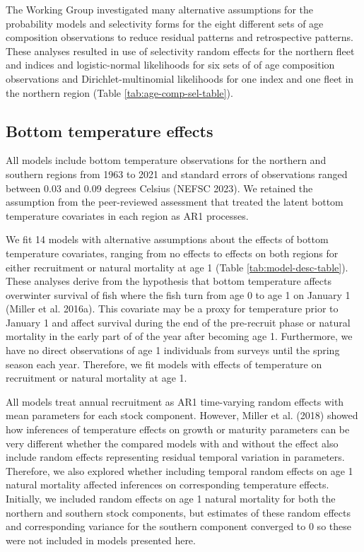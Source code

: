 \documentclass[
]{article}
\begin{document}
The Working Group investigated many alternative assumptions for the
probability models and selectivity forms for the eight different sets of
age composition observations to reduce residual patterns and
retrospective patterns. These analyses resulted in use of selectivity
random effects for the northern fleet and indices and logistic-normal
likelihoods for six sets of of age composition observations and
Dirichlet-multinomial likelihoods for one index and one fleet in the
northern region (Table \ref{tab:age-comp-sel-table}).

\hypertarget{bottom-temperature-effects}{%
\subsection*{Bottom temperature
effects}\label{bottom-temperature-effects}}

All models include bottom temperature observations for the northern and
southern regions from 1963 to 2021 and standard errors of observations
ranged between 0.03 and 0.09 degrees Celsius (NEFSC 2023). We retained
the assumption from the peer-reviewed assessment that treated the latent
bottom temperature covariates in each region as AR1 processes.

We fit 14 models with alternative assumptions about the effects of
bottom temperature covariates, ranging from no effects to effects on
both regions for either recruitment or natural mortality at age 1 (Table
\ref{tab:model-desc-table}). These analyses derive from the hypothesis
that bottom temperature affects overwinter survival of fish where the
fish turn from age 0 to age 1 on January 1 (Miller et al. 2016a). This
covariate may be a proxy for temperature prior to January 1 and affect
survival during the end of the pre-recruit phase or natural mortality in
the early part of of the year after becoming age 1. Furthermore, we have
no direct observations of age 1 individuals from surveys until the
spring season each year. Therefore, we fit models with effects of
temperature on recruitment or natural mortality at age 1.

All models treat annual recruitment as AR1 time-varying random effects
with mean parameters for each stock component. However, Miller et al.
(2018) showed how inferences of temperature effects on growth or
maturity parameters can be very different whether the compared models
with and without the effect also include random effects representing
residual temporal variation in parameters. Therefore, we also explored
whether including temporal random effects on age 1 natural mortality
affected inferences on corresponding temperature effects. Initially, we
included random effects on age 1 natural mortality for both the northern
and southern stock components, but estimates of these random effects and
corresponding variance for the southern component converged to 0 so
these were not included in models presented here.
\end{document}
